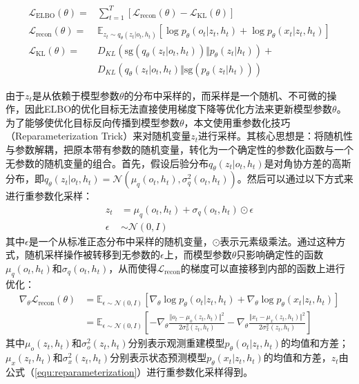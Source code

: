 \begin{equation}
\begin{aligned}
    \mathcal{L}_{\text{ELBO}}(\theta) =& \sum_{t=1}^T [ \mathcal{L}_{\text{recon}}(\theta) -\mathcal{L}_{\text{KL}}(\theta) ] \\
    \mathcal{L}_{\text{recon}}(\theta) =& \mathbb{E}_{z_t\sim q_{\theta}(z_t\vert o_t, h_t)} [\log p_{\theta}(o_t\vert z_t, h_t) + \log p_{\theta}(x_t\vert z_t, h_t)] \\
    \mathcal{L}_{\text{KL}}(\theta) =& D_{KL}\left(\text{sg}(q_{\theta}(z_t\vert o_t, h_t)) \Vert p_{\theta}(z_t\vert h_t)\right) +\\
    & D_{KL}\left(q_{\theta}(z_t\vert o_t, h_t) \Vert \text{sg}(p_{\theta}(z_t\vert h_t))\right)
\end{aligned}
\end{equation}

由于$z_t$是从依赖于模型参数$\theta$的分布中采样的，而采样是一个随机、不可微的操作，因此ELBO的优化目标无法直接使用梯度下降等优化方法来更新模型参数$\theta$。为了能够使优化目标反向传播到模型参数$\theta$，本文使用重参数化技巧（Reparameterization Trick）来对随机变量$z_t$进行采样。其核心思想是：将随机性与参数解耦，把原本带有参数的随机变量，转化为一个确定性的参数化函数与一个无参数的随机变量的组合。首先，假设后验分布$q_{\theta}(z_t\vert o_t, h_t)$是对角协方差的高斯分布，即$q_{\theta}(z_t\vert o_t, h_t) = \mathcal{N}(\mu_{q}(o_t, h_t), \sigma^2_{q}(o_t, h_t))$。然后可以通过以下方式来进行重参数化采样：
\begin{equation}
\begin{aligned}
    z_t &= \mu_{q}(o_t, h_t) + \sigma_{q}(o_t, h_t) \odot \epsilon \\
    \epsilon &\sim \mathcal{N}(0, I)
\end{aligned}
\label{equ:reparameterization}
\end{equation}
其中$\epsilon$是一个从标准正态分布中采样的随机变量，$\odot$表示元素级乘法。通过这种方式，随机采样操作被转移到无参数的$\epsilon$上，而模型参数$\theta$只影响确定性的函数$\mu_{q}(o_t, h_t)$和$\sigma_{q}(o_t, h_t)$，从而使得$\mathcal{L}_{\text{recon}}$的梯度可以直接移到内部的函数上进行优化：
\begin{equation}
\begin{aligned}
    \nabla_{\theta} \mathcal{L}_{\text{recon}}(\theta) &= \mathbb{E}_{\epsilon \sim \mathcal{N}(0, I)} \left[ \nabla_{\theta} \log p_{\theta}(o_t\vert z_t, h_t) + \nabla_{\theta} \log p_{\theta}(x_t\vert z_t, h_t) \right]\\
    &= \mathbb{E}_{\epsilon \sim \mathcal{N}(0, I)} \left[-\nabla_{\theta} \frac{\Vert o_t - \mu_o(z_t, h_t) \Vert^2}{2 \sigma_o^2(z_t, h_t)} - \nabla_{\theta}  \frac{\Vert x_t - \mu_x(z_t, h_t) \Vert^2}{2 \sigma_x^2(z_t, h_t)} \right]
\end{aligned}
\end{equation}
其中$\mu_o(z_t, h_t)$和$\sigma_o^2(z_t, h_t)$分别表示观测重建模型$p_{\theta}(o_t\vert z_t, h_t)$的均值和方差；$\mu_x(z_t, h_t)$和$\sigma_x^2(z_t, h_t)$分别表示状态预测模型$p_{\theta}(x_t\vert z_t, h_t)$的均值和方差，$z_t$由公式（\ref{equ:reparameterization}）进行重参数化采样得到。

